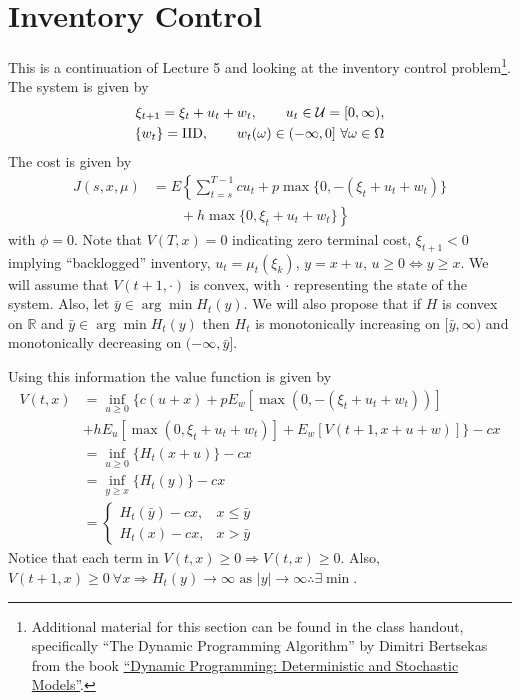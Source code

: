 \mainmatter%
\setcounter{page}{1}

\lectureseries[\course]{\course}

\date{October 15, 2009}

\setaddress%

\setcounter{lecture}{5}
\setcounter{chapter}{5}


\section{Inventory Control}
This is a continuation of Lecture 5 and looking at the inventory control problem\footnote{Additional material for this section can be found in the class handout, specifically ``The Dynamic Programming Algorithm'' by Dimitri Bertsekas from the book
\href{http://www.amazon.com/Dynamic-Programming-Deterministic-Stochastic-Models/dp/0132215810}{``Dynamic Programming: Deterministic and Stochastic Models''}.}.
The system is given by
\begin{align*}
\xi_{t+1} = \xi_t+u_t+w_t, \qquad u_t\in\mathcal{U} = [0,\infty), \\%
\{w_t\} = \text{IID}, \qquad w_t(\w) \in (-\infty,0]~\forall \w\in\Omega%
\end{align*}
The cost is given by
\begin{align*}
J(s,x,\mu) &= E\left\lbrace\sum_{t=s}^{T-1} cu_t + p\max\{0,-(\xi_t+u_t+w_t)\} \right. \\
&\left. \qquad + h\max\{0,\xi_t+u_t+w_t\}\right\rbrace
\end{align*}
with $\phi=0$.
Note that $V(T,x)=0$ indicating zero terminal cost, $\xi_{t+1}<0$ implying ``backlogged'' inventory, $u_t=\mu_t(\xi_k)$, $y=x+u$, $u\geq 0\Leftrightarrow y\geq x$.
We will assume that $V(t+1,\cdot)$ is convex, with $\cdot$ representing the state of the system.
Also, let $\bar{y}\in\arg\min H_t(y)$.
We will also propose that if $H$ is convex on $\mathbb{R}$ and $\bar{y}\in\arg\min H_t(y)$ then $H_t$ is monotonically increasing on $[\bar{y},\infty)$ and monotonically decreasing on $(-\infty,\bar{y}]$.%

Using this information the value function is given by
\begin{align*}
V(t,x) &= \inf_{u\geq 0} \{c(u+x) + pE_w[\max(0,-(\xi_t+u_t+w_t))] \\
&+ hE_u[\max(0,\xi_t+u_t+w_t)] + E_w[V(t+1,x+u+w)]\} - cx \\
&= \inf_{u\geq 0} \{H_t(x+u)\} - cx \\
&= \inf_{y\geq x}\{H_t(y)\} - cx \\
&= \begin{cases} H_t(\bar{y})-cx, & x\leq\bar{y} \\ H_t(x)-cx, & x>\bar{y} \end{cases}
\end{align*}
Notice that each term in $V(t,x)\geq 0 \Rightarrow V(t,x)\geq 0$.
Also, $V(t+1,x)\geq 0~\forall x \Rightarrow H_t(y)\to\infty \text{~as~} |y|\to\infty \therefore \exists \min$.

